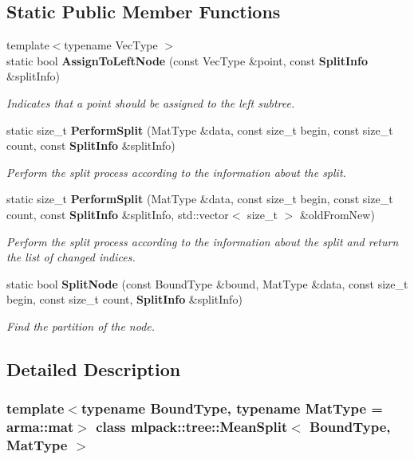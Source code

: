 \subsection*{Static Public Member Functions}
\begin{DoxyCompactItemize}
\item 
{\footnotesize template$<$typename Vec\+Type $>$ }\\static bool \textbf{ Assign\+To\+Left\+Node} (const Vec\+Type \&point, const \textbf{ Split\+Info} \&split\+Info)
\begin{DoxyCompactList}\small\item\em Indicates that a point should be assigned to the left subtree. \end{DoxyCompactList}\item 
static size\+\_\+t \textbf{ Perform\+Split} (Mat\+Type \&data, const size\+\_\+t begin, const size\+\_\+t count, const \textbf{ Split\+Info} \&split\+Info)
\begin{DoxyCompactList}\small\item\em Perform the split process according to the information about the split. \end{DoxyCompactList}\item 
static size\+\_\+t \textbf{ Perform\+Split} (Mat\+Type \&data, const size\+\_\+t begin, const size\+\_\+t count, const \textbf{ Split\+Info} \&split\+Info, std\+::vector$<$ size\+\_\+t $>$ \&old\+From\+New)
\begin{DoxyCompactList}\small\item\em Perform the split process according to the information about the split and return the list of changed indices. \end{DoxyCompactList}\item 
static bool \textbf{ Split\+Node} (const Bound\+Type \&bound, Mat\+Type \&data, const size\+\_\+t begin, const size\+\_\+t count, \textbf{ Split\+Info} \&split\+Info)
\begin{DoxyCompactList}\small\item\em Find the partition of the node. \end{DoxyCompactList}\end{DoxyCompactItemize}


\subsection{Detailed Description}
\subsubsection*{template$<$typename Bound\+Type, typename Mat\+Type = arma\+::mat$>$\newline
class mlpack\+::tree\+::\+Mean\+Split$<$ Bound\+Type, Mat\+Type $>$}

